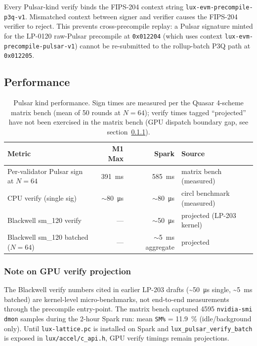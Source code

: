 Every Pulsar-kind verify binds the FIPS-204 context string
\texttt{lux-evm-precompile-p3q-v1}. Mismatched context between
signer and verifier causes the FIPS-204 verifier to reject. This
prevents cross-precompile replay: a Pulsar signature minted for
the LP-0120 raw-Pulsar precompile at \texttt{0x012204} (which
uses context \texttt{lux-evm-precompile-pulsar-v1}) cannot be
re-submitted to the rollup-batch P3Q path at \texttt{0x012205}.

\subsection{Performance}

\begin{table}[h]
\centering
\small
\begin{tabular}{@{}lrrl@{}}
\toprule
\textbf{Metric} & \textbf{M1 Max} & \textbf{Spark} & \textbf{Source} \\
\midrule
Per-validator Pulsar sign at $N{=}64$ & \SI{391}{\milli\second} & \SI{585}{\milli\second} & matrix bench (measured)~\cite{parityaudit} \\
CPU verify (single sig) & $\sim$\SI{80}{\micro\second} & $\sim$\SI{80}{\micro\second} & circl benchmark (measured) \\
Blackwell sm\_120 verify & --- & $\sim$\SI{50}{\micro\second} & projected (LP-203 kernel) \\
Blackwell sm\_120 batched ($N{=}64$) & --- & $\sim$\SI{5}{\milli\second} aggregate & projected \\
\bottomrule
\end{tabular}
\caption{Pulsar kind performance. Sign times are measured per
the Quasar 4-scheme matrix bench (mean of 50 rounds at $N{=}64$);
verify times tagged ``projected'' have not been exercised in the
matrix bench (GPU dispatch boundary gap, see
section~\ref{sec:pulsar-perf-note}).}
\label{tab:pulsar-perf}
\end{table}

\subsubsection{Note on GPU verify projection}
\label{sec:pulsar-perf-note}

The Blackwell verify numbers cited in earlier LP-203 drafts
(\textasciitilde\SI{50}{\micro\second} single,
\textasciitilde\SI{5}{\milli\second} batched) are kernel-level
micro-benchmarks, not end-to-end measurements through the
precompile entry-point. The matrix bench captured \num{4595}
\texttt{nvidia-smi dmon} samples during the 2-hour Spark run:
mean \texttt{SM\%} = \SI{11.9}{\percent} (idle/background only).
Until \texttt{lux-lattice.pc} is installed on Spark and
\texttt{lux\_pulsar\_verify\_batch} is exposed in
\texttt{lux/accel/c\_api.h}, GPU verify timings remain
projections.

